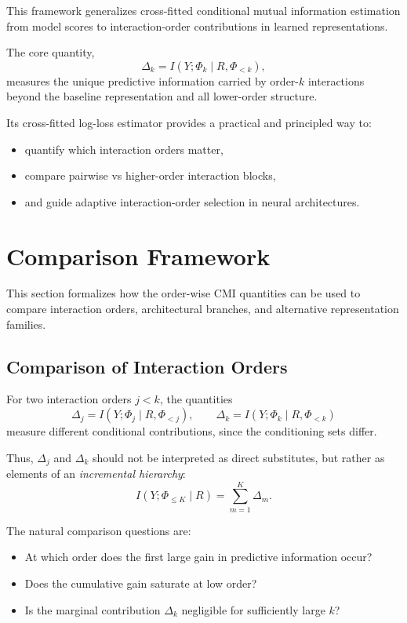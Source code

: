\documentclass[11pt]{article}
\newcommand{\1}{\mathbf{1}}
\begin{document}
This framework generalizes cross-fitted conditional mutual information estimation from model
scores to interaction-order contributions in learned representations.

The core quantity,
\[
\Delta_k = I(Y;\Phi_k \mid R,\Phi_{<k}),
\]
measures the unique predictive information carried by order-$k$ interactions beyond the baseline
representation and all lower-order structure.

Its cross-fitted log-loss estimator provides a practical and principled way to:
\begin{itemize}[leftmargin=1.5em]
    \item quantify which interaction orders matter,
    \item compare pairwise vs higher-order interaction blocks,
    \item and guide adaptive interaction-order selection in neural architectures.
\end{itemize}

\section{Comparison Framework}

This section formalizes how the order-wise CMI quantities can be used to compare interaction
orders, architectural branches, and alternative representation families.

\subsection{Comparison of Interaction Orders}

For two interaction orders $j < k$, the quantities
\[
\Delta_j = I(Y;\Phi_j \mid R,\Phi_{<j}),
\qquad
\Delta_k = I(Y;\Phi_k \mid R,\Phi_{<k})
\]
measure different conditional contributions, since the conditioning sets differ.

Thus, $\Delta_j$ and $\Delta_k$ should not be interpreted as direct substitutes, but rather as
elements of an \emph{incremental hierarchy}:
\[
I(Y;\Phi_{\le K}\mid R) = \sum_{m=1}^K \Delta_m.
\]

The natural comparison questions are:
\begin{itemize}[leftmargin=1.5em]
    \item At which order does the first large gain in predictive information occur?
    \item Does the cumulative gain saturate at low order?
    \item Is the marginal contribution $\Delta_k$ negligible for sufficiently large $k$?
\end{itemize}
\end{document}

